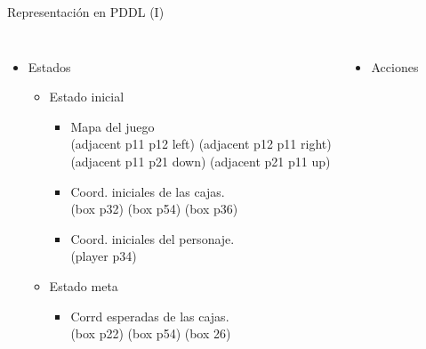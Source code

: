 \documentclass{beamer}
\begin{document}
\begin{frame}{Representación en PDDL (I)}
    \begin{columns}
    \begin{itemize}
    \item Estados
    \begin{itemize}
        \item Estado inicial
        \begin{itemize}
            \item Mapa del juego \\
            (adjacent p11 p12 left) (adjacent p12 p11 right) \\
            (adjacent p11 p21 down) (adjacent p21 p11 up) \\
            \item Coord. iniciales de las cajas. \\
            (box p32) (box p54) (box p36) \\
            \item Coord. iniciales del personaje. \\
            (player p34)
        \end{itemize}
        \item Estado meta
        \begin{itemize}
            \item Corrd esperadas de las cajas. \\
            (box p22) (box p54) (box 26)
        \end{itemize}
    \end{itemize}
    \end{itemize}
    \begin{itemize}
    \item Acciones
    
    \end{itemize}
    \end{columns}
\end{frame}

\end{document}
